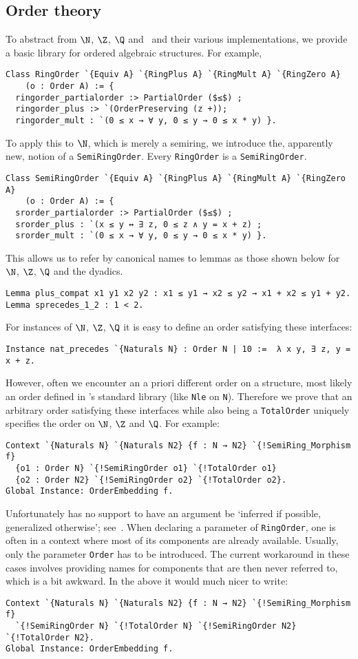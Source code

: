\documentclass[a4paper,10pt,runningheads]{llncs}
\begin{document}
\subsection{Order theory}
To abstract from $\N$, $\Z$, $\Q$ and \R\ and their various implementations, we provide a basic library for ordered algebraic structures. For example,
\begin{lstlisting}
Class RingOrder `{Equiv A} `{RingPlus A} `{RingMult A} `{RingZero A} 
	(o : Order A) := { 
  ringorder_partialorder :> PartialOrder ($≤$) ;
  ringorder_plus :> `(OrderPreserving (z +));
  ringorder_mult : `(0 ≤ x → ∀ y, 0 ≤ y → 0 ≤ x * y) }.
\end{lstlisting}
To apply this to $\N$, which is merely a semiring, we introduce the, apparently new, notion of a \lstinline|SemiRingOrder|. Every \lstinline|RingOrder| is a \lstinline|SemiRingOrder|.
\begin{lstlisting}
Class SemiRingOrder `{Equiv A} `{RingPlus A} `{RingMult A} `{RingZero A} 
	(o : Order A) := { 
  srorder_partialorder :> PartialOrder ($≤$) ;
  srorder_plus : `(x ≤ y ↔ ∃ z, 0 ≤ z ∧ y = x + z) ;
  srorder_mult : `(0 ≤ x → ∀ y, 0 ≤ y → 0 ≤ x * y) }.
\end{lstlisting}
This allows us to refer by canonical names to lemmas as those shown below for $\N$, $\Z$, $\Q$ and the dyadics.
\begin{lstlisting}
Lemma plus_compat x1 y1 x2 y2 : x1 ≤ y1 → x2 ≤ y2 → x1 + x2 ≤ y1 + y2.
Lemma sprecedes_1_2 : 1 < 2.
\end{lstlisting}
For instances of $\N$, $\Z$, $\Q$ it is easy to define an order satisfying these interfaces:
\begin{lstlisting}
Instance nat_precedes `{Naturals N} : Order N | 10 :=  λ x y, ∃ z, y = x + z.
\end{lstlisting}
However, often we encounter an a priori different order on a structure, most likely an order defined in \Coq's standard library (like \lstinline|Nle| on \lstinline|N|). Therefore we prove that an arbitrary order satisfying these interfaces while also being a \lstinline|TotalOrder| uniquely specifies the order on $\N$, $\Z$ and $\Q$. For example:
\begin{lstlisting}
Context `{Naturals N} `{Naturals N2} {f : N → N2} `{!SemiRing_Morphism f}
  {o1 : Order N} `{!SemiRingOrder o1} `{!TotalOrder o1}
  {o2 : Order N2} `{!SemiRingOrder o2} `{!TotalOrder o2}.
Global Instance: OrderEmbedding f.
\end{lstlisting}
Unfortunately \Coq{} has no support to have an argument be `inferred if possible, generalized otherwise'; see~\cite{math-classes}. When declaring a parameter of \lstinline|RingOrder|, one is often in a context where most of its components are already available. Usually, only the parameter \lstinline|Order| has to be introduced. The current workaround in these cases involves providing names for components that are then never referred to, which is a bit awkward. In the above it would much nicer to write:
\begin{lstlisting}
Context `{Naturals N} `{Naturals N2} {f : N → N2} `{!SemiRing_Morphism f}
  `{!SemiRingOrder N} `{!TotalOrder N} `{!SemiRingOrder N2} `{!TotalOrder N2}.
Global Instance: OrderEmbedding f.
\end{lstlisting}
\end{document}
